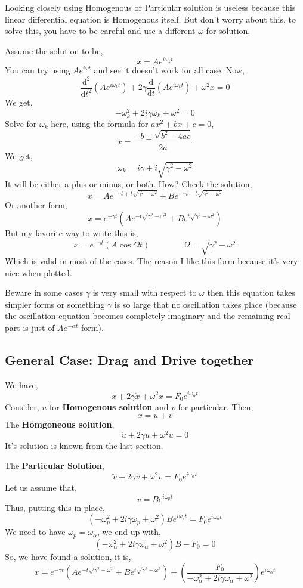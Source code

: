 \documentclass[11pt, a4paper]{memoir}
\begin{document}
Looking closely using Homogenous or Particular solution is useless because this linear differential equation is Homogenous itself. But don't worry about this, to solve this, you have to be careful and use a different $\omega$ for solution. 

Assume the solution to be,
\[ 
x = Ae^{i \omega_{ k} t}
\]
You can try using $Ae^{i \omega t}$ and see it doesn't work for all case. Now, 
\[ 
    \frac{\mathrm{d} ^2}{\mathrm{d} t^2} \left( A e^{i \omega_{ k} t} \right) + 
    2 \gamma \frac{\mathrm{d} }{\mathrm{d} t} \left( A e^{ i \omega_{ k} t} \right) +
    \omega^2 x = 0
\]
We get,
\[ 
- \omega_{ k} ^2 + 2 i \gamma \omega_{ k} + \omega^2 = 0
\]
Solve for $\omega_{ k}$ here, using the formula for $ax^2 + bx + c =0$,
\[ 
x = \frac{- b \pm \sqrt{b^2 - 4ac} }{2a}
\]
We get,
\[ 
\omega_{ k} = i \gamma \pm i \sqrt{\gamma^2 - \omega^2} 
\]
It will be either a plus or minus, or both. How? Check the solution,
\[ 
    \boxed{ x = A e^{-\gamma t + t\sqrt{\gamma^2 - \omega^2} } + Be^{- \gamma t - t \sqrt{\gamma^2 - \omega^2} }}
\]
Or another form,
\[ 
    \boxed{ x = e^{- \gamma t} \left( A e^{-t \sqrt{\gamma^2 - \omega^2} } + Be^{t \sqrt{\gamma^2 - \omega^2} } \right) }
\]
But my favorite way to write this is,
\[ 
    \boxed{  x = e^{- \gamma t} \left( A \cos \Omega t \right) } \quad \quad \quad \quad \Omega = \sqrt{\gamma^2 - \omega^2} 
\]
Which is valid in most of the cases. The reason I like this form because it's very nice when plotted. 

Beware in some cases $\gamma$ is very small with respect to $\omega$ then this equation takes simpler forms or something $\gamma$ is so large that no oscillation takes place (because the oscillation equation becomes completely imaginary and the remaining real part is just of $Ae^{ -\alpha t}$ form).




\subsection{ General Case: Drag and Drive together}
We have,
\[ 
    \boxed{ \ddot{ x} + 2 \gamma \dot{x} + \omega^2 x = F_0 e^{i \omega_{ \alpha} t}}
\]
Consider, $u$ for  \textbf{Homogenous solution} and $v$ for particular. Then,
\[ 
x = u + v
\]
The \textbf{Homgoneous solution},
\[ 
\ddot{u} + 2 \gamma \dot{u} + \omega^2 u = 0
\]
It's solution is known from the last section. 

The \textbf{Particular Solution}, 
\[ 
\ddot{ v} + 2 \gamma \dot{v} + \omega^2 v = F_0e^{i \omega_{ \alpha} t}
\]
Let us assume that,
\[ 
v = B e^{i \omega_{p} t}
\]
Thus, putting this in place, 
\[ 
    \left(-\omega_{ p} ^2+ 2 i \gamma \omega_{ p} + \omega^2  \right) Be^{i \omega_{ p} t} = F_0 e^{ i \omega_{ \alpha} t }
\]
We need to have $\omega_{ p} = \omega_{ \alpha}$, we end up with,
\[ 
    (    - \omega_{ \alpha}^2 + 2 i \gamma \omega_{ \alpha} + \omega^2 )B- F_0 = 0
\]
So, we have found a solution, it is,
\[ 
    \boxed{ x = e^{- \gamma t} \left( Ae^{ - t \sqrt{\gamma^2 - \omega^2} } + Be^{t \sqrt{\gamma^2 - \omega^2} } \right) + 
        \left( \frac{F_0}{- \omega_{ \alpha}^2 + 2 i \gamma \omega_{ \alpha} + \omega^2} \right) 
        e^{ i \omega_{ \alpha} t}
    }
\]
\end{document}

